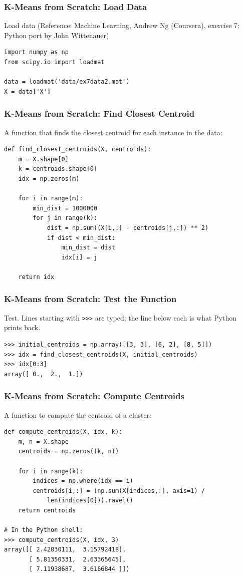 \begin{frame}[fragile]\frametitle{K-Means from Scratch: Load Data}
Load data
{\tiny (Reference: Machine Learning, Andrew Ng (Coursera), exercise 7; Python port by John Wittenauer)}
\begin{lstlisting}
import numpy as np
from scipy.io import loadmat

data = loadmat('data/ex7data2.mat')
X = data['X']
\end{lstlisting}
\end{frame}

\begin{frame}[fragile]\frametitle{K-Means from Scratch: Find Closest Centroid}
A function that finds the closest centroid for each instance in the data:
\begin{lstlisting}
def find_closest_centroids(X, centroids):
    m = X.shape[0]
    k = centroids.shape[0]
    idx = np.zeros(m)
    
    for i in range(m):
        min_dist = 1000000
        for j in range(k):
            dist = np.sum((X[i,:] - centroids[j,:]) ** 2)
            if dist < min_dist:
                min_dist = dist
                idx[i] = j
    
    return idx
\end{lstlisting}
\end{frame}

\begin{frame}[fragile]\frametitle{K-Means from Scratch: Test the Function}
Test. Lines starting with \texttt{>>>} are typed; the line below each is what Python prints
back.
\begin{lstlisting}
>>> initial_centroids = np.array([[3, 3], [6, 2], [8, 5]])
>>> idx = find_closest_centroids(X, initial_centroids)
>>> idx[0:3]
array([ 0.,  2.,  1.])
\end{lstlisting}

\end{frame}


\begin{frame}[fragile]\frametitle{K-Means from Scratch: Compute Centroids}
A function to compute the centroid of a cluster:
\begin{lstlisting}
def compute_centroids(X, idx, k):
    m, n = X.shape
    centroids = np.zeros((k, n))
    
    for i in range(k):
        indices = np.where(idx == i)
        centroids[i,:] = (np.sum(X[indices,:], axis=1) /
            len(indices[0])).ravel()
    return centroids

# In the Python shell:
>>> compute_centroids(X, idx, 3)
array([[ 2.42830111,  3.15792418],
       [ 5.81350331,  2.63365645],
       [ 7.11938687,  3.6166844 ]])
\end{lstlisting}
\end{frame}

